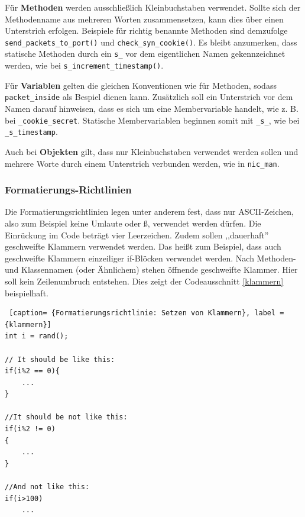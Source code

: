 \documentclass[../review_3.tex]{subfiles}
\begin{document}
Für \textbf{Methoden} werden ausschließlich Kleinbuchstaben verwendet. Sollte sich der Methodenname aus mehreren Worten zusammensetzen, kann dies über einen Unterstrich erfolgen. Beispiele für richtig benannte Methoden sind demzufolge \texttt{send\_packets\_to\_port()} und \texttt{check\_syn\_cookie()}. Es bleibt anzumerken, dass statische Methoden durch ein \texttt{s\_} vor dem eigentlichen Namen gekennzeichnet werden, wie bei \texttt{s\_increment\_timestamp()}.

Für \textbf{Variablen} gelten die gleichen Konventionen wie für Methoden, sodass \texttt{packet\_inside} als Bespiel dienen kann. Zusätzlich soll ein Unterstrich vor dem Namen darauf hinweisen, dass es sich um eine Membervariable handelt, wie z. B. bei \texttt{\_cookie\_secret}. Statische Membervariablen beginnen somit mit \texttt{\_s\_}, wie bei \texttt{\_s\_timestamp}.

Auch bei \textbf{Objekten} gilt, dass nur Kleinbuchstaben verwendet werden sollen und mehrere Worte durch einem Unterstrich verbunden werden, wie in \texttt{nic\_man}.

\subsubsection{Formatierungs-Richtlinien}
Die Formatierungsrichtlinien legen unter anderem fest, dass nur ASCII-Zeichen, also zum Beispiel keine Umlaute oder  ß, verwendet werden dürfen. Die Einrückung im Code beträgt vier Leerzeichen. Zudem sollen ,,dauerhaft'' geschweifte Klammern verwendet werden. Das heißt zum Beispiel, dass auch geschweifte Klammern einzeiliger if-Blöcken verwendet werden. Nach Methoden- und Klassennamen (oder Ähnlichem) stehen öffnende geschweifte Klammer. Hier soll kein Zeilenumbruch entstehen. Dies zeigt der Codeausschnitt \ref{klammern} beispielhaft.
\begin{lstlisting} [caption= {Formatierungsrichtlinie: Setzen von Klammern}, label = {klammern}]
int i = rand();
         
// It should be like this:
if(i%2 == 0){
    ...
}
         
//It should be not like this:
if(i%2 != 0)
{
    ...
}

//And not like this:
if(i>100)
    ...\end{lstlisting}
\end{document}

